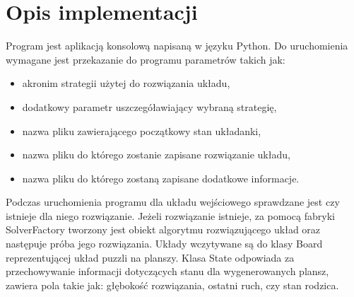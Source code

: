 \documentclass{classrep}
\begin{document}
\section{Opis implementacji}
{\color{black}
Program jest aplikacją konsolową napisaną w języku Python. Do uruchomienia wymagane jest przekazanie do programu parametrów takich jak:
  \begin{itemize}
  \item akronim strategii użytej do rozwiązania układu,
  \item dodatkowy parametr uszczegóławiający wybraną strategię,
  \item nazwa pliku zawierającego początkowy stan układanki,
  \item nazwa pliku do którego zostanie zapisane rozwiązanie układu,
  \item nazwa pliku do którego zostaną zapisane dodatkowe informacje.
  \end{itemize}
Podczas uruchomienia programu dla układu wejściowego sprawdzane jest czy istnieje dla niego rozwiązanie. Jeżeli rozwiązanie istnieje, za pomocą fabryki SolverFactory tworzony jest obiekt algorytmu rozwiązującego układ oraz następuje próba jego rozwiązania. Układy wczytywane są do klasy Board reprezentującej układ puzzli na planszy. Klasa State odpowiada za przechowywanie informacji dotyczących stanu dla wygenerowanych plansz, zawiera pola takie jak: głębokość rozwiązania, ostatni ruch, czy stan rodzica.

}
\end{document}
